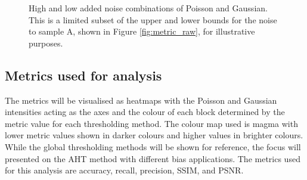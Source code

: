 \begin{figure}
	\centering
	\caption[High and low added noise combinations of Poisson and Gaussian.]{High and low added noise combinations of Poisson and Gaussian. This is a limited subset of the upper and lower bounds for the noise to sample A, shown in Figure \ref{fig:metric_raw}, for illustrative purposes.}
	\label{fig:noise_examples}
\end{figure}

\FloatBarrier
\subsection{Metrics used for analysis}
 The metrics will be visualised as heatmaps with the Poisson and Gaussian intensities acting as the axes and the colour of each block determined by the metric value for each thresholding method. The colour map used is magma with lower metric values shown in darker colours and higher values in brighter colours. While the global thresholding methods will be shown for reference, the focus will presented on the AHT method with different bias applications. The metrics used for this analysis are accuracy, recall, precision, SSIM, and PSNR.

